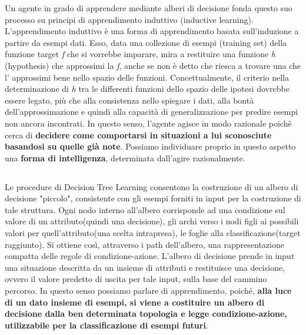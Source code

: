 			Un agente in grado di apprendere mediante alberi di decisione fonda questo suo processo su principi di apprendimento induttivo (\textsf{inductive learning}). L'apprendimento induttivo è una forma di apprendimento basata sull'induzione a partire da esempi dati. Esso, data una collezione di esempi (\textsf{training set}) della funzione \textsf{target} \emph{f} che si vorrebbe imparare, mira a restituire una funzione \emph{h} (\textsf{hypothesis}) che approssimi la \emph{f}, anche se non è detto che riesca a trovare una che l' approssimi bene nello spazio delle funzioni. Concettualmente, il criterio nella determinazione di \emph{h} tra le differenti funzioni dello spazio delle ipotesi dovrebbe essere legato, più che alla consistenza nello spiegare i dati, alla bontà dell'approssimazione e quindi alla capacità di generalizzazione per predire esempi non ancora incontrati. In questo senso, l'agente agisce in modo razionale poichè cerca di \textbf{decidere come comportarsi in situazioni a lui sconosciute basandosi su quelle già note}. Possiamo individuare proprio in questo aspetto una \textbf{forma di intelligenza}, determinata dall'agire razionalmente.
		\subsection{}
			Le procedure di \textsf{Decision Tree Learning} consentono la costruzione di un albero di decisione "piccolo", consistente con gli esempi forniti in input per la costruzione di tale struttura. Ogni nodo interno all'albero corrisponde ad una condizione sul valore di un attributo(quindi una decisione), gli archi verso i nodi figli ai possibili valori per quell'attributo(una scelta intrapresa), le foglie alla classificazione(target raggiunto). Si ottiene così, attraverso i \textsf{path} dell'albero, una rappresentazione compatta delle regole di condizione-azione. L'albero di decisione prende in input una situazione descritta da un insieme di attributi e restituisce una decisione, ovvero il valore predetto di uscita per tale input, sulla base del cammino percorso. In questo senso possiamo parlare di apprendimento, poiché, \textbf{alla luce di un dato insieme di esempi, si viene a costituire un albero di decisione dalla ben determinata topologia e legge condizione-azione, utilizzabile per la classificazione di esempi futuri}.
